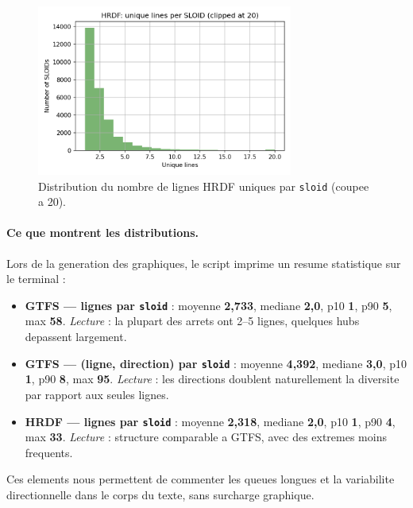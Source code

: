 \begin{figure}[H]
  \centering
  \includegraphics[width=0.75\textwidth]{../figures/chap4/hist_hrdf_lines_per_sloid.png}
  \caption{Distribution du nombre de lignes HRDF uniques par \texttt{sloid} (coupee a 20).}
\end{figure}

\paragraph{Ce que montrent les distributions.} Lors de la generation des graphiques, le script imprime un resume statistique sur le terminal :
\begin{itemize}
  \item \textbf{GTFS --- lignes par \texttt{sloid}} : moyenne \textbf{2,733}, mediane \textbf{2,0}, p10 \textbf{1}, p90 \textbf{5}, max \textbf{58}. \emph{Lecture} : la plupart des arrets ont 2--5 lignes, quelques hubs depassent largement.
  \item \textbf{GTFS --- (ligne, direction) par \texttt{sloid}} : moyenne \textbf{4,392}, mediane \textbf{3,0}, p10 \textbf{1}, p90 \textbf{8}, max \textbf{95}. \emph{Lecture} : les directions doublent naturellement la diversite par rapport aux seules lignes.
  \item \textbf{HRDF --- lignes par \texttt{sloid}} : moyenne \textbf{2,318}, mediane \textbf{2,0}, p10 \textbf{1}, p90 \textbf{4}, max \textbf{33}. \emph{Lecture} : structure comparable a GTFS, avec des extremes moins frequents.
\end{itemize}
Ces elements nous permettent de commenter les queues longues et la variabilite directionnelle dans le corps du texte, sans surcharge graphique.

